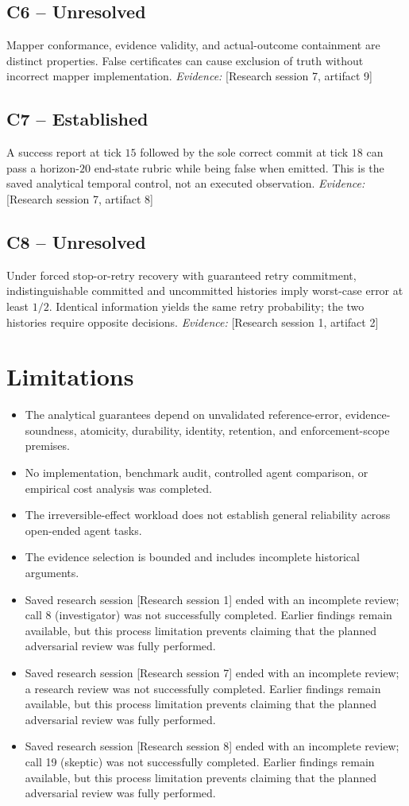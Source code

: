 \documentclass[11pt]{article}
\begin{document}
\begin{sloppypar}
\subsection{C6 -- Unresolved}
Mapper conformance, evidence validity, and actual-outcome containment are distinct properties.
False certificates can cause exclusion of truth without incorrect mapper implementation.
\textit{Evidence: }[Research session 7, artifact 9]
\subsection{C7 -- Established}
A success report at tick $15$ followed by the sole correct commit at tick $18$ can pass a horizon-$20$ end-state rubric while being false when emitted.
This is the saved analytical temporal control, not an executed observation.
\textit{Evidence: }[Research session 7, artifact 8]
\subsection{C8 -- Unresolved}
Under forced stop-or-retry recovery with guaranteed retry commitment, indistinguishable committed and uncommitted histories imply worst-case error at least $1/2$.
Identical information yields the same retry probability; the two histories require opposite decisions.
\textit{Evidence: }[Research session 1, artifact 2]
\end{sloppypar}
\section{Limitations}
\begin{itemize}
\item The analytical guarantees depend on unvalidated reference-error, evidence-soundness, atomicity, durability, identity, retention, and enforcement-scope premises.
\item No implementation, benchmark audit, controlled agent comparison, or empirical cost analysis was completed.
\item The irreversible-effect workload does not establish general reliability across open-ended agent tasks.
\item The evidence selection is bounded and includes incomplete historical arguments.
\item Saved research session [Research session 1] ended with an incomplete review; call 8 (investigator) was not successfully completed. Earlier findings remain available, but this process limitation prevents claiming that the planned adversarial review was fully performed.
\item Saved research session [Research session 7] ended with an incomplete review; a research review was not successfully completed. Earlier findings remain available, but this process limitation prevents claiming that the planned adversarial review was fully performed.
\item Saved research session [Research session 8] ended with an incomplete review; call 19 (skeptic) was not successfully completed. Earlier findings remain available, but this process limitation prevents claiming that the planned adversarial review was fully performed.
\end{itemize}
\end{document}
